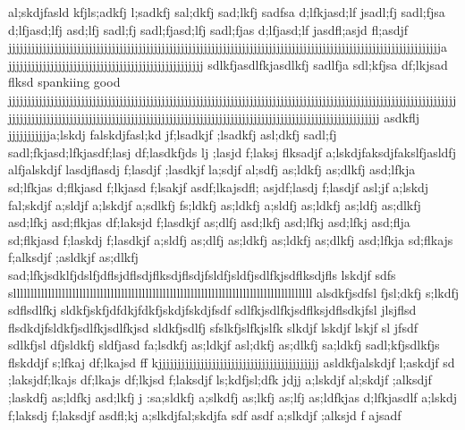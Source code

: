 al;skdjfasld kfjls;adkfj l;sadkfj sal;dkfj sad;lkfj sadfsa d;lfkjasd;lf jsadl;fj sadl;fjsa d;lfjasd;lfj asd;lfj sadl;fj sadl;fjasd;lfj sadl;fjas d;lfjasd;lf jasdfl;asjd fl;asdjf   jjjjjjjjjjjjjjjjjjjjjjjjjjjjjjjjjjjjjjjjjjjjjjjjjjjjjjjjjjjjjjjjjjjjjjjjjjjjjjjjjjjjjjjjjjjjjjjjjjjjjjjjjjjjjjjjja         jjjjjjjjjjjjjjjjjjjjjjjjjjjjjjjjjjjjjjjjjjjjjjjjjjj                                                                                                                                               sdlkfjasdlfkjasdlkfj sadlfja sdl;kfjsa df;lkjsad flksd spankiing good jjjjjjjjjjjjjjjjjjjjjjjjjjjjjjjjjjjjjjjjjjjjjjjjjjjjjjjjjjjjjjjjjjjjjjjjjjjjjjjjjjjjjjjjjjjjjjjjjjjjjjjjjjjjjjjjjjjjjjjjjjjjjjjjjjjjjjjjjjjjjjjjjjjjjjjjjjjjjjjjjjjjjjjjjjjjjjjjjjjjjjjjjjjjjjjjjjjjjjjjjjjjjjjjjjjjjj                                                                                                          asdkflj jjjjjjjjjjja;lskdj falskdjfasl;kd jf;lsadkjf ;lsadkfj asl;dkfj sadl;fj sadl;fkjasd;lfkjasdf;lasj df;lasdkfjds lj ;lasjd f;laksj flksadjf                                                                        a;lskdjfaksdjfakslfjasldfj alfjalskdjf lasdjflasdj f;lasdjf ;lasdkjf la;sdjf al;sdfj as;ldkfj as;dlkfj asd;lfkja sd;lfkjas d;flkjasd f;lkjasd f;lsakjf                                                                          asdf;lkajsdfl; asjdf;lasdj f;lasdjf asl;jf                                                                              a;lskdj fal;skdjf a;sldjf a;lskdjf a;sdlkfj fs;ldkfj as;ldkfj a;sldfj as;ldkfj as;ldfj as;dlkfj asd;lfkj asd;flkjas df;laksjd f;lasdkjf as;dlfj asd;lkfj asd;lfkj asd;lfkj asd;flja sd;flkjasd f;laskdj f;lasdkjf a;sldfj as;dlfj as;ldkfj as;ldkfj as;dlkfj asd;lfkja sd;flkajs f;alksdjf ;asldkjf as;dlkfj sad;lfkjsdklfjdslfjdflsjdflsdjflksdjflsdjfsldfjsldfjsdlfkjsdflksdjfls lskdjf sdfs sllllllllllllllllllllllllllllllllllllllllllllllllllllllllllllllllllllllllllllllllllllll                                                                         alsdkfjsdfsl fjsl;dkfj s;lkdfj sdflsdlfkj                                                                      sldkfjskfjdfdkjfdkfjskdjfskdjfsdf                                               sdlfkjsdlfkjsdflksjdflsdkjfsl jlsjflsd flsdkdjfsldkfjsdlfkjsdlfkjsd sldkfjsdlfj                                                                     sfslkfjslfkjslfk slkdjf lskdjf lskjf sl jfsdf                                                                           sdlkfjsl dfjsldkfj sldfjasd fa;lsdkfj as;ldkjf asl;dkfj as;dlkfj sa;ldkfj sadl;kfjsdlkfjs flskddjf s;lfkaj df;lkajsd ff kjjjjjjjjjjjjjjjjjjjjjjjjjjjjjjjjjjjjjjjjjj                                                                                                                             asldkfjalskdjf l;askdjf sd                                                                              ;laksjdf;lkajs df;lkajs df;lkjsd f;laksdjf ls;kdfjsl;dfk jdjj                     a;lskdjf al;skdjf ;alksdjf ;laskdfj as;ldfkj asd;lkfj j                                                                                                                                                               :sa;sldkfj a;slkdfj as;lkfj as;lfj as;ldfkjas d;lfkjasdlf a;lskdj f;laksdj f;laksdjf asdfl;kj   a;slkdjfal;skdjfa sdf                               asdf a;slkdjf ;alksjd f                ajsadf      